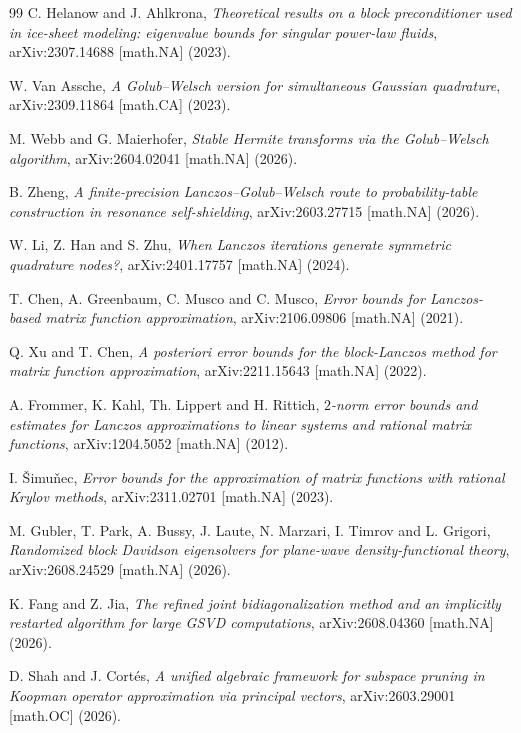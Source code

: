 \documentclass[11pt]{article}
\theoremstyle{remark}
\begin{document}
\begin{thebibliography}{99}
C. Helanow and J. Ahlkrona, \emph{Theoretical results on a block preconditioner used in ice-sheet
modeling: eigenvalue bounds for singular power-law fluids}, arXiv:2307.14688 [math.NA] (2023).

W. Van Assche, \emph{A Golub--Welsch version for simultaneous Gaussian quadrature},
arXiv:2309.11864 [math.CA] (2023).

M. Webb and G. Maierhofer, \emph{Stable Hermite transforms via the Golub--Welsch algorithm},
arXiv:2604.02041 [math.NA] (2026).

B. Zheng, \emph{A finite-precision Lanczos--Golub--Welsch route to probability-table construction in
resonance self-shielding}, arXiv:2603.27715 [math.NA] (2026).

W. Li, Z. Han and S. Zhu, \emph{When Lanczos iterations generate symmetric quadrature nodes?},
arXiv:2401.17757 [math.NA] (2024).

T. Chen, A. Greenbaum, C. Musco and C. Musco, \emph{Error bounds for Lanczos-based matrix function
approximation}, arXiv:2106.09806 [math.NA] (2021).

Q. Xu and T. Chen, \emph{A posteriori error bounds for the block-Lanczos method for matrix function
approximation}, arXiv:2211.15643 [math.NA] (2022).

A. Frommer, K. Kahl, Th. Lippert and H. Rittich, \emph{$2$-norm error bounds and estimates for
Lanczos approximations to linear systems and rational matrix functions}, arXiv:1204.5052 [math.NA]
(2012).

I. \v{S}imu\v{n}ec, \emph{Error bounds for the approximation of matrix functions with rational Krylov
methods}, arXiv:2311.02701 [math.NA] (2023).

M. Gubler, T. Park, A. Bussy, J. Laute, N. Marzari, I. Timrov and L. Grigori, \emph{Randomized block
Davidson eigensolvers for plane-wave density-functional theory}, arXiv:2608.24529 [math.NA] (2026).

K. Fang and Z. Jia, \emph{The refined joint bidiagonalization method and an implicitly restarted
algorithm for large GSVD computations}, arXiv:2608.04360 [math.NA] (2026).

D. Shah and J. Cort\'{e}s, \emph{A unified algebraic framework for subspace pruning in Koopman
operator approximation via principal vectors}, arXiv:2603.29001 [math.OC] (2026).


\end{thebibliography}
\end{document}
